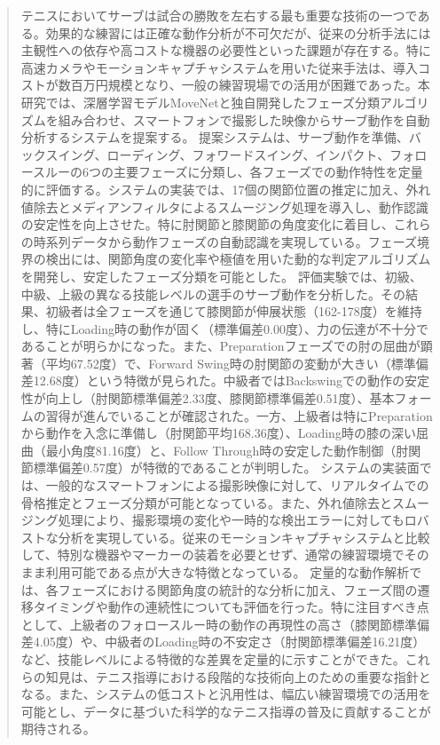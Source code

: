 \documentclass[oneside]{suribt}[11pt]
\begin{document}
\frontmatter
\begin{abstract}
    テニスにおいてサーブは試合の勝敗を左右する最も重要な技術の一つである。効果的な練習には正確な動作分析が不可欠だが、従来の分析手法には主観性への依存や高コストな機器の必要性といった課題が存在する。特に高速カメラやモーションキャプチャシステムを用いた従来手法は、導入コストが数百万円規模となり、一般の練習現場での活用が困難であった。本研究では、深層学習モデルMoveNetと独自開発したフェーズ分類アルゴリズムを組み合わせ、スマートフォンで撮影した映像からサーブ動作を自動分析するシステムを提案する。
    提案システムは、サーブ動作を準備、バックスイング、ローディング、フォワードスイング、インパクト、フォロースルーの6つの主要フェーズに分類し、各フェーズでの動作特性を定量的に評価する。システムの実装では、17個の関節位置の推定に加え、外れ値除去とメディアンフィルタによるスムージング処理を導入し、動作認識の安定性を向上させた。特に肘関節と膝関節の角度変化に着目し、これらの時系列データから動作フェーズの自動認識を実現している。フェーズ境界の検出には、関節角度の変化率や極値を用いた動的な判定アルゴリズムを開発し、安定したフェーズ分類を可能とした。
    評価実験では、初級、中級、上級の異なる技能レベルの選手のサーブ動作を分析した。その結果、初級者は全フェーズを通じて膝関節が伸展状態（162-178度）を維持し、特にLoading時の動作が固く（標準偏差0.00度）、力の伝達が不十分であることが明らかになった。また、Preparationフェーズでの肘の屈曲が顕著（平均67.52度）で、Forward Swing時の肘関節の変動が大きい（標準偏差12.68度）という特徴が見られた。中級者ではBackswingでの動作の安定性が向上し（肘関節標準偏差2.33度、膝関節標準偏差0.51度）、基本フォームの習得が進んでいることが確認された。一方、上級者は特にPreparationから動作を入念に準備し（肘関節平均168.36度）、Loading時の膝の深い屈曲（最小角度81.16度）と、Follow Through時の安定した動作制御（肘関節標準偏差0.57度）が特徴的であることが判明した。
    システムの実装面では、一般的なスマートフォンによる撮影映像に対して、リアルタイムでの骨格推定とフェーズ分類が可能となっている。また、外れ値除去とスムージング処理により、撮影環境の変化や一時的な検出エラーに対してもロバストな分析を実現している。従来のモーションキャプチャシステムと比較して、特別な機器やマーカーの装着を必要とせず、通常の練習環境でそのまま利用可能である点が大きな特徴となっている。
    定量的な動作解析では、各フェーズにおける関節角度の統計的な分析に加え、フェーズ間の遷移タイミングや動作の連続性についても評価を行った。特に注目すべき点として、上級者のフォロースルー時の動作の再現性の高さ（膝関節標準偏差4.05度）や、中級者のLoading時の不安定さ（肘関節標準偏差16.21度）など、技能レベルによる特徴的な差異を定量的に示すことができた。これらの知見は、テニス指導における段階的な技術向上のための重要な指針となる。また、システムの低コストと汎用性は、幅広い練習環境での活用を可能とし、データに基づいた科学的なテニス指導の普及に貢献することが期待される。
    \end{abstract}
\end{document}
